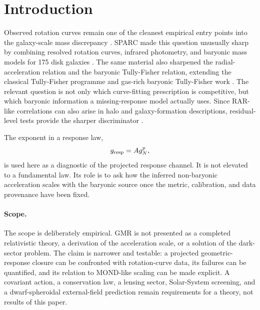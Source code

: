 ﻿\documentclass[twocolumn]{aastex631}
\begin{document}
\section{Introduction}
Observed rotation curves remain one of the cleanest empirical entry points into the galaxy-scale mass discrepancy \citep{Rubin1970,Rubin1980,Bosma1981,Begeman1991,SofueRubin2001}.  SPARC made this question unusually sharp by combining resolved rotation curves, infrared photometry, and baryonic mass models for 175 disk galaxies \citep{Lelli2016SPARC}.  The same material also sharpened the radial-acceleration relation and the baryonic Tully-Fisher relation, extending the classical Tully-Fisher programme and gas-rich baryonic Tully-Fisher work \citep{TullyFisher1977,McGaugh2000,McGaugh2005,McGaugh2012,McGaugh2016RAR,Lelli2017BTFR,Schombert2020}.  The relevant question is not only which curve-fitting prescription is competitive, but which baryonic information a missing-response model actually uses.  Since RAR-like correlations can also arise in halo and galaxy-formation descriptions, residual-level tests provide the sharper discriminator \citep{Li2020,Desmond2017,Ludlow2017,Navarro2017RAR,Dutton2019}.

The exponent in a response law,
\begin{equation}
g_{\rm resp}=A g_N^p ,
\end{equation}
is used here as a diagnostic of the projected response channel.  It is not elevated to a fundamental law.  Its role is to ask how the inferred non-baryonic acceleration scales with the baryonic source once the metric, calibration, and data provenance have been fixed.

\paragraph{Scope.}
The scope is deliberately empirical.  GMR is not presented as a completed relativistic theory, a derivation of the acceleration scale, or a solution of the dark-sector problem.  The claim is narrower and testable: a projected geometric-response closure can be confronted with rotation-curve data, its failures can be quantified, and its relation to MOND-like scaling can be made explicit.  A covariant action, a conservation law, a lensing sector, Solar-System screening, and a dwarf-spheroidal external-field prediction remain requirements for a theory, not results of this paper.
\end{document}
